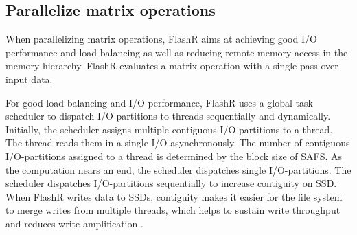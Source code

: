 
\subsection{Parallelize matrix operations}

When parallelizing matrix operations, FlashR aims at achieving
good I/O performance and load balancing as well as reducing remote memory access
in the memory hierarchy. FlashR evaluates a matrix operation with
a single pass over input data.

For good load balancing and I/O performance, FlashR uses a global task scheduler
to dispatch I/O-partitions to threads sequentially and dynamically. Initially,
the scheduler assigns
multiple contiguous I/O-partitions to a thread. The thread reads them in
a single I/O asynchronously. The number of contiguous I/O-partitions
assigned to a thread is determined by the block size of SAFS.
As the computation nears an end, the scheduler dispatches single I/O-partitions. 
The scheduler dispatches I/O-partitions sequentially to increase contiguity
on SSD. When FlashR writes data to SSDs,
contiguity makes it easier for the file system to merge
writes from multiple threads, which helps to sustain write throughput and reduces
write amplification \cite{ripq}.

